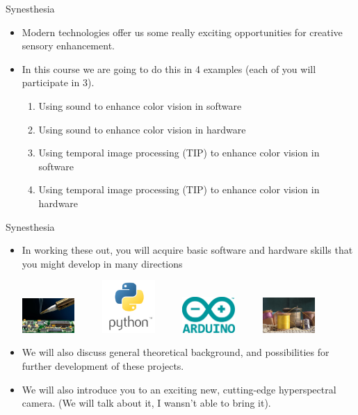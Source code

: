 \documentclass{beamer}
\begin{document}
\begin{frame}{Synesthesia}
   \begin{itemize}
      \item Modern technologies offer us some really exciting opportunities for creative sensory enhancement.
      \item In this course we are going to do this in 4 examples (each of you will participate in 3).
      \begin{enumerate}
         \item Using sound to enhance color vision in software
         \item Using sound to enhance color vision in hardware
         \item Using temporal image processing (TIP) to enhance color vision in software
         \item Using temporal image processing (TIP) to enhance color vision in hardware
      \end{enumerate}
   \end{itemize}
\end{frame}

\begin{frame}{Synesthesia}
   \begin{itemize}
      \item In working these out, you will acquire basic software and hardware skills that you might develop in many directions \\
      \begin{center}
      \includegraphics[width=2cm]{figures/solder.jpg}
      ~ ~ ~
      \includegraphics[width=2cm]{figures/python.png}
      ~ ~ ~
      \includegraphics[width=2cm]{figures/arduino.png}
      ~ ~ ~
      \includegraphics[width=2cm]{figures/sew.jpg}
      \end{center}
      \item We will also discuss general theoretical background, and possibilities for further development of these projects.
      \item We will also introduce you to an exciting new, cutting-edge hyperspectral camera. (We will talk about it, I wansn't able to bring it).
   \end{itemize}
\end{frame}
\end{document}
